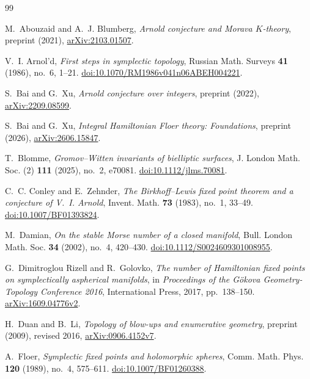 \begin{thebibliography}{99}

M.~Abouzaid and A.~J. Blumberg,
\emph{Arnold conjecture and Morava $K$-theory},
preprint (2021), \href{https://arxiv.org/abs/2103.01507}{arXiv:2103.01507}.

V.~I. Arnol'd,
\emph{First steps in symplectic topology},
Russian Math. Surveys \textbf{41} (1986), no.~6, 1--21.
\href{https://doi.org/10.1070/RM1986v041n06ABEH004221}{doi:10.1070/RM1986v041n06ABEH004221}.

S.~Bai and G.~Xu,
\emph{Arnold conjecture over integers},
preprint (2022), \href{https://arxiv.org/abs/2209.08599}{arXiv:2209.08599}.

S.~Bai and G.~Xu,
\emph{Integral Hamiltonian Floer theory: Foundations},
preprint (2026), \href{https://arxiv.org/abs/2606.15847}{arXiv:2606.15847}.

T.~Blomme,
\emph{Gromov--Witten invariants of bielliptic surfaces},
J. London Math. Soc. (2) \textbf{111} (2025), no.~2, e70081.
\href{https://doi.org/10.1112/jlms.70081}{doi:10.1112/jlms.70081}.

C.~C. Conley and E.~Zehnder,
\emph{The Birkhoff--Lewis fixed point theorem and a conjecture of V.~I. Arnold},
Invent. Math. \textbf{73} (1983), no.~1, 33--49.
\href{https://doi.org/10.1007/BF01393824}{doi:10.1007/BF01393824}.

M.~Damian,
\emph{On the stable Morse number of a closed manifold},
Bull. London Math. Soc. \textbf{34} (2002), no.~4, 420--430.
\href{https://doi.org/10.1112/S0024609301008955}{doi:10.1112/S0024609301008955}.

G.~Dimitroglou Rizell and R.~Golovko,
\emph{The number of Hamiltonian fixed points on symplectically aspherical manifolds},
in \emph{Proceedings of the G\"okova Geometry-Topology Conference 2016},
International Press, 2017, pp.~138--150.
\href{https://arxiv.org/abs/1609.04776v2}{arXiv:1609.04776v2}.

H.~Duan and B.~Li,
\emph{Topology of blow-ups and enumerative geometry},
preprint (2009), revised 2016,
\href{https://arxiv.org/abs/0906.4152v7}{arXiv:0906.4152v7}.

A.~Floer,
\emph{Symplectic fixed points and holomorphic spheres},
Comm. Math. Phys. \textbf{120} (1989), no.~4, 575--611.
\href{https://doi.org/10.1007/BF01260388}{doi:10.1007/BF01260388}.


\end{thebibliography}
